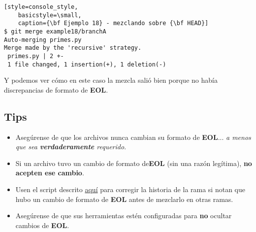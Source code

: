 \begin{lstlisting}[style=console_style,
	basicstyle=\small,
	caption={\bf Ejemplo 18} - mezclando sobre {\bf HEAD}]
$ git merge example18/branchA
Auto-merging primes.py
Merge made by the 'recursive' strategy.
 primes.py | 2 +-
 1 file changed, 1 insertion(+), 1 deletion(-)
\end{lstlisting}

Y podemos ver cómo en este caso la mezcla salió bien porque no había discrepancias de formato de {\bf EOL}.

\subsection{Tips}
\begin{itemize}
	\item Asegúrense de que los archivos nunca cambian su formato de {\bf EOL}... {\it a menos que sea {\bf verdaderamente} requerido}.
	\item Si un archivo tuvo un cambio de formato de{\bf EOL} (sin una razón legítima), {\bf no acepten ese cambio}.
	\item Usen el script descrito \hyperref[correct_eol_history]{aquí} para corregir la historia de la rama si notan que hubo un cambio
	de formato de {\bf EOL} antes de mezclarlo en otras ramas.
	\item Asegúrense de que sus herramientas estén configuradas para {\bf no} ocultar cambios de {\bf EOL}.
\end{itemize}
